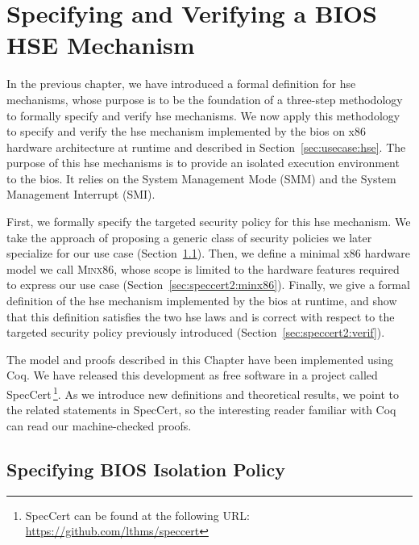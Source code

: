 \chapter{Specifying and Verifying a BIOS HSE Mechanism}
\label{chapter:speccert2}


\vspace{1cm}\noindent
%
In the previous chapter, we have introduced a formal definition for \ac{hse}
mechanisms, whose purpose is to be the foundation of a three-step methodology to
formally specify and verify \ac{hse} mechanisms.
%
We now apply this methodology to specify and verify the \ac{hse} mechanism
implemented by the \ac{bios} on x86 hardware architecture at runtime and
described in Section~\ref{sec:usecase:hse}.
%
The purpose of this \ac{hse} mechanisms is to provide an isolated execution
environment to the \ac{bios}. It relies on the System Management Mode (SMM) and
the System Management Interrupt (SMI).

First, we formally specify the targeted security policy for this \ac{hse}
mechanism.
%
We take the approach of proposing a generic class of security policies we later
specialize for our use case (Section~\ref{sec:speccert2:usecase}).
%
Then, we define a minimal x86 hardware model we call {\scshape Minx86}, whose
scope is limited to the hardware features required to express our use case
(Section~\ref{sec:speccert2:minx86}).
%
Finally, we give a formal definition of the \ac{hse} mechanism implemented by
the \ac{bios} at runtime, and show that this definition satisfies the two
\ac{hse} laws and is correct with respect to the targeted security policy
previously introduced (Section~\ref{sec:speccert2:verif}).

The model and proofs described in this Chapter have been implemented using Coq.
%
We have released this development as free software in a project called SpecCert\,\footnote{SpecCert can be found at the following
  URL: \url{https://github.com/lthms/speccert}}.
%
As we introduce new definitions and theoretical results, we point to the related
statements in SpecCert, so the interesting reader familiar with Coq can
read our machine-checked proofs. 

\section{Specifying BIOS Isolation Policy}
\label{sec:speccert2:usecase}

